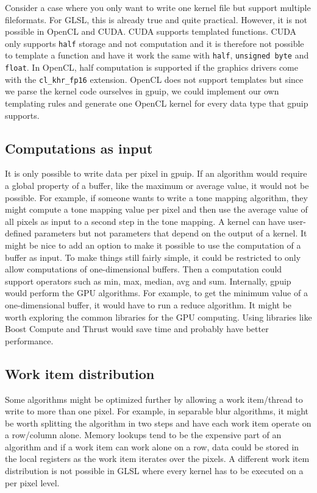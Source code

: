 Consider a case where you only want to write one kernel file but support multiple fileformats. For GLSL, this is already true and quite practical. However, it is not possible in OpenCL and CUDA. CUDA supports templated functions. CUDA only supports {\tt half} storage and not computation and it is therefore not possible to template a function and have it work the same with {\tt half}, {\tt unsigned byte} and {\tt float}. In OpenCL, half computation is supported if the graphics drivers come with the {\tt cl\_khr\_fp16} extension. OpenCL does not support templates but since we parse the kernel code ourselves in gpuip, we could implement our own templating rules and generate one OpenCL kernel for every data type that gpuip supports. 

\subsection{Computations as input}

It is only possible to write data per pixel in gpuip. If an algorithm would require a global property of a buffer, like the maximum or average value, it would not be possible. For example, if someone wants to write a tone mapping algorithm, they might compute a tone mapping value per pixel and then use the average value of all pixels as input to a second step in the tone mapping. A kernel can have user-defined parameters but not parameters that depend on the output of a kernel. It might be nice to add an option to make it possible to use the computation of a buffer as input. To make things still fairly simple, it could be restricted to only allow computations of one-dimensional buffers. Then a computation could support operators such as min, max, median, avg and sum. Internally, gpuip would perform the GPU algorithms. For example, to get the minimum value of a one-dimensional buffer, it would have to run a reduce algorithm. It might be worth exploring the common libraries for the GPU computing. Using libraries like Boost Compute\cite{boostcompute} and Thrust\cite{cudathrust} would save time and probably have better performance.

\subsection{Work item distribution}

Some algorithms might be optimized further by allowing a work item/thread to write to more than one pixel. For example, in separable blur algorithms, it might be worth splitting the algorithm in two steps and have each work item operate on a row/column alone. Memory lookups tend to be the expensive part of an algorithm and if a work item can work alone on a row, data could be stored in the local registers as the work item iterates over the pixels. A different work item distribution is not possible in GLSL where every kernel has to be executed on a per pixel level.

